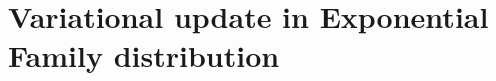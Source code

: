 \documentclass{article}
\begin{document}
%
%
%
%
%
%
%
%
%
%
%
%
%





\section{Variational update in Exponential Family distribution}
%
\end{document}

